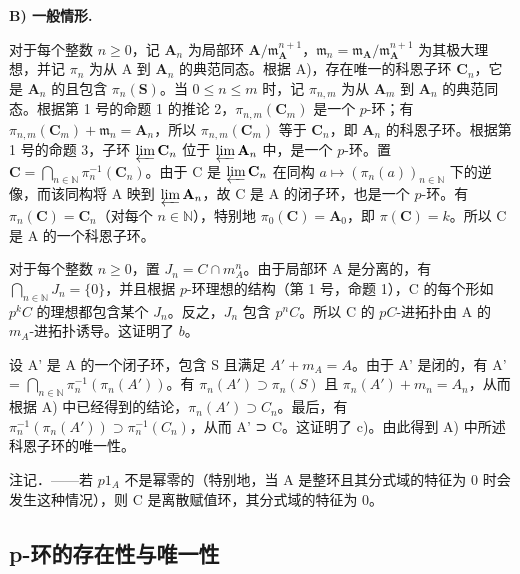 \noindent\textbf{B) 一般情形.}\par

对于每个整数 \(n \geqslant 0\)，记 \(\mathbf{A}_n\) 为局部环 \(\mathbf{A}/\mathfrak{m}_{\mathbf{A}}^{n+1}\)，\(\mathfrak{m}_n = \mathfrak{m}_{\mathbf{A}}/\mathfrak{m}_{\mathbf{A}}^{n+1}\) 为其极大理想，并记 \(\pi_n\) 为从 A 到 \(\mathbf{A}_n\) 的典范同态。根据 A)，存在唯一的科恩子环 \(\mathbf{C}_n\)，它是 \(\mathbf{A}_n\) 的且包含 \(\pi_n(\mathbf{S})\)。当 \(0 \leqslant n \leqslant m\) 时，记 \(\pi_{n,m}\) 为从 \(\mathbf{A}_m\) 到 \(\mathbf{A}_n\) 的典范同态。根据第 1 号的命题 1 的推论 2，\(\pi_{n,m}(\mathbf{C}_m)\) 是一个 \(p\)-环；有 \(\pi_{n,m}(\mathbf{C}_m) + \mathfrak{m}_n = \mathbf{A}_n\)，所以 \(\pi_{n,m}(\mathbf{C}_m)\) 等于 \(\mathbf{C}_n\)，即 \(\mathbf{A}_n\) 的科恩子环。根据第 1 号的命题 3，子环 \(\varprojlim \mathbf{C}_n\) 位于 \(\varprojlim \mathbf{A}_n\) 中，是一个 \(p\)-环。置 \(\mathbf{C} = \bigcap_{n \in \mathbb{N}} \pi_n^{-1}(\mathbf{C}_n)\)。由于 C 是 \(\varprojlim \mathbf{C}_n\) 在同构 \(a \mapsto (\pi_n(a))_{n \in \mathbb{N}}\) 下的逆像，而该同构将 A 映到 \(\varprojlim \mathbf{A}_n\)，故 C 是 A 的闭子环，也是一个 \(p\)-环。有 \(\pi_n(\mathbf{C}) = \mathbf{C}_n\)（对每个 \(n \in \mathbb{N}\)），特别地 \(\pi_0(\mathbf{C}) = \mathbf{A}_0\)，即 \(\pi(\mathbf{C}) = k\)。所以 C 是 A 的一个科恩子环。

对于每个整数 \(n \geqslant 0\)，置 \(J_{n} = C \cap m_{A}^{n}\)。由于局部环 A 是分离的，有 \(\bigcap_{n \in \mathbb{N}} J_{n} = \{0\}\)，并且根据 \(p\)-环理想的结构（第 1 号，命题 1），C 的每个形如 \(p^{k}C\) 的理想都包含某个 \(J_{n}\)。反之，\(J_{n}\) 包含 \(p^{n}C\)。所以 C 的 \(pC\)-进拓扑由 A 的 \(m_{A}\)-进拓扑诱导。这证明了 \(b\)。

设 A' 是 A 的一个闭子环，包含 S 且满足 \(A' + m_{A} = A\)。由于 A' 是闭的，有 A' = \(\bigcap_{n\in\mathbb{N}}\pi_n^{-1}(\pi_n(A'))\)。有 \(\pi_n(A') \supset \pi_n(S)\) 且 \(\pi_n(A') + m_n = A_n\)，从而根据 A) 中已经得到的结论，\(\pi_n(A') \supset C_n\)。最后，有 \(\pi_n^{-1}(\pi_n(A')) \supset \pi_n^{-1}(C_n)\)，从而 A' ⊃ C。这证明了 c)。由此得到 A) 中所述科恩子环的唯一性。

注记．——若 \(p1_{A}\) 不是幂零的（特别地，当 A 是整环且其分式域的特征为 0 时会发生这种情况），则 C 是离散赋值环，其分式域的特征为 0。

\subsection{p-环的存在性与唯一性}

